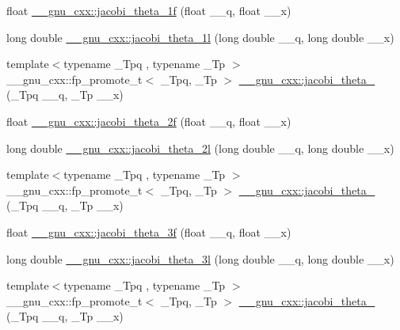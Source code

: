 \begin{DoxyCompactItemize}
\item 
float \hyperlink{group__gnu__math__spec__func_gacccd2107c26e39400e589a59e0af674a}{\+\_\+\+\_\+gnu\+\_\+cxx\+::jacobi\+\_\+theta\+\_\+1f} (float \+\_\+\+\_\+q, float \+\_\+\+\_\+x)
\item 
long double \hyperlink{group__gnu__math__spec__func_ga823eba555ecac89556a0f4c1e62dbc5a}{\+\_\+\+\_\+gnu\+\_\+cxx\+::jacobi\+\_\+theta\+\_\+1l} (long double \+\_\+\+\_\+q, long double \+\_\+\+\_\+x)
\item 
{\footnotesize template$<$typename \+\_\+\+Tpq , typename \+\_\+\+Tp $>$ }\\\+\_\+\+\_\+gnu\+\_\+cxx\+::fp\+\_\+promote\+\_\+t$<$ \+\_\+\+Tpq, \+\_\+\+Tp $>$ \hyperlink{group__gnu__math__spec__func_gaf6b13dac1f112a870299d75cb4cf42cc}{\+\_\+\+\_\+gnu\+\_\+cxx\+::jacobi\+\_\+theta\+\_} (\+\_\+\+Tpq \+\_\+\+\_\+q, \+\_\+\+Tp \+\_\+\+\_\+x)
\item 
float \hyperlink{group__gnu__math__spec__func_gaa99e91c0753410a42b57cbf417cf7ea0}{\+\_\+\+\_\+gnu\+\_\+cxx\+::jacobi\+\_\+theta\+\_\+2f} (float \+\_\+\+\_\+q, float \+\_\+\+\_\+x)
\item 
long double \hyperlink{group__gnu__math__spec__func_ga2db5cb3025b9068e79dc7aa21bc9af5b}{\+\_\+\+\_\+gnu\+\_\+cxx\+::jacobi\+\_\+theta\+\_\+2l} (long double \+\_\+\+\_\+q, long double \+\_\+\+\_\+x)
\item 
{\footnotesize template$<$typename \+\_\+\+Tpq , typename \+\_\+\+Tp $>$ }\\\+\_\+\+\_\+gnu\+\_\+cxx\+::fp\+\_\+promote\+\_\+t$<$ \+\_\+\+Tpq, \+\_\+\+Tp $>$ \hyperlink{group__gnu__math__spec__func_gaf4eac2990db1dadba66ae688ceaa6403}{\+\_\+\+\_\+gnu\+\_\+cxx\+::jacobi\+\_\+theta\+\_} (\+\_\+\+Tpq \+\_\+\+\_\+q, \+\_\+\+Tp \+\_\+\+\_\+x)
\item 
float \hyperlink{group__gnu__math__spec__func_ga6ff9738978be029e90e1f144ab4aa165}{\+\_\+\+\_\+gnu\+\_\+cxx\+::jacobi\+\_\+theta\+\_\+3f} (float \+\_\+\+\_\+q, float \+\_\+\+\_\+x)
\item 
long double \hyperlink{group__gnu__math__spec__func_ga313109bbf08d81e93196eb73c2047dd2}{\+\_\+\+\_\+gnu\+\_\+cxx\+::jacobi\+\_\+theta\+\_\+3l} (long double \+\_\+\+\_\+q, long double \+\_\+\+\_\+x)
\item 
{\footnotesize template$<$typename \+\_\+\+Tpq , typename \+\_\+\+Tp $>$ }\\\+\_\+\+\_\+gnu\+\_\+cxx\+::fp\+\_\+promote\+\_\+t$<$ \+\_\+\+Tpq, \+\_\+\+Tp $>$ \hyperlink{group__gnu__math__spec__func_ga676501b6284d5702a3dc61252e6c78ab}{\+\_\+\+\_\+gnu\+\_\+cxx\+::jacobi\+\_\+theta\+\_} (\+\_\+\+Tpq \+\_\+\+\_\+q, \+\_\+\+Tp \+\_\+\+\_\+x)

\end{DoxyCompactItemize}
